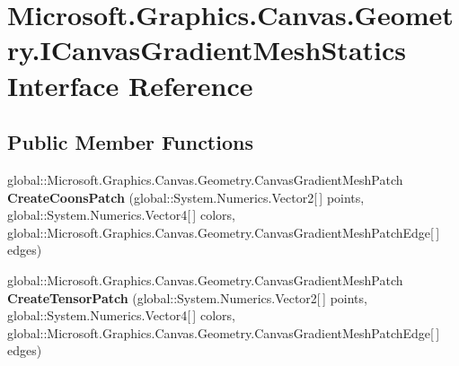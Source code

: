 \hypertarget{interface_microsoft_1_1_graphics_1_1_canvas_1_1_geometry_1_1_i_canvas_gradient_mesh_statics}{}\section{Microsoft.\+Graphics.\+Canvas.\+Geometry.\+I\+Canvas\+Gradient\+Mesh\+Statics Interface Reference}
\label{interface_microsoft_1_1_graphics_1_1_canvas_1_1_geometry_1_1_i_canvas_gradient_mesh_statics}
\subsection*{Public Member Functions}
\begin{DoxyCompactItemize}
\item 
\mbox{\label{interface_microsoft_1_1_graphics_1_1_canvas_1_1_geometry_1_1_i_canvas_gradient_mesh_statics_ae8992067a301a411c734f0e902fb4a18}} 
global\+::\+Microsoft.\+Graphics.\+Canvas.\+Geometry.\+Canvas\+Gradient\+Mesh\+Patch {\bfseries Create\+Coons\+Patch} (global\+::\+System.\+Numerics.\+Vector2\mbox{[}$\,$\mbox{]} points, global\+::\+System.\+Numerics.\+Vector4\mbox{[}$\,$\mbox{]} colors, global\+::\+Microsoft.\+Graphics.\+Canvas.\+Geometry.\+Canvas\+Gradient\+Mesh\+Patch\+Edge\mbox{[}$\,$\mbox{]} edges)
\item 
\mbox{\label{interface_microsoft_1_1_graphics_1_1_canvas_1_1_geometry_1_1_i_canvas_gradient_mesh_statics_a128a934c6dc2b5cb9ae41b70720dedaf}} 
global\+::\+Microsoft.\+Graphics.\+Canvas.\+Geometry.\+Canvas\+Gradient\+Mesh\+Patch {\bfseries Create\+Tensor\+Patch} (global\+::\+System.\+Numerics.\+Vector2\mbox{[}$\,$\mbox{]} points, global\+::\+System.\+Numerics.\+Vector4\mbox{[}$\,$\mbox{]} colors, global\+::\+Microsoft.\+Graphics.\+Canvas.\+Geometry.\+Canvas\+Gradient\+Mesh\+Patch\+Edge\mbox{[}$\,$\mbox{]} edges)
\item 
\mbox{\label{interface_microsoft_1_1_graphics_1_1_canvas_1_1_geometry_1_1_i_canvas_gradient_mesh_statics_ae8992067a301a411c734f0e902fb4a18}} 

\end{DoxyCompactItemize}
